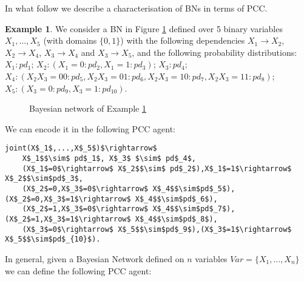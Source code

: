 \documentclass[letterpaper]{article}
\theoremstyle{plain}
\theoremstyle{definition}
\theoremstyle{remark}
\theoremstyle{definition}
\newtheorem{example}{Example}[section]
\begin{document}
In what follow we describe a characterisation of BNs in terms of PCC.
\begin{example}\label{exBN}
We consider a BN in Figure \ref{BN} 
defined over 5 binary variables $X_1, \ldots, X_5$ (with domains $\{0,1\}$) with the following dependencies $X_1 \rightarrow X_2$, $X_2 \rightarrow X_4$, $X_3 \rightarrow X_4$ and $X_3 \rightarrow X_5$, and the following probability distributions:
$X_1 : pd_1$; $X_2 : (X_1 = 0 : pd_2, X_1=1 : pd_3)$; $X_3 : pd_4$; $X_4 : (X_2 X_3 = 0 0  : pd_5, X_2 X_3 = 0 1  : pd_6, X_2 X_3 = 1 0  : pd_7, X_2  X_3 = 1 1  : pd_8)$; $X_5 : (X_3 = 0 : pd_9, X_3=1 : pd_{10})$.
\begin{figure}[h!]
\begin{center}
\scriptsize
{}
\caption{Bayesian network of Example \ref{exBN}}
\label{BN}
\end{center}
\end{figure}
We can encode it in the following PCC agent: 
\begin{lstlisting}[mathescape=true]
joint(X$_1$,...,X$_5$)$\rightarrow$
	X$_1$$\sim$ pd$_1$, X$_3$ $\sim$ pd$_4$, 
	(X$_1$=0$\rightarrow$ X$_2$$\sim$ pd$_2$),X$_1$=1$\rightarrow$ X$_2$$\sim$pd$_3$,
	(X$_2$=0,X$_3$=0$\rightarrow$ X$_4$$\sim$pd$_5$),(X$_2$=0,X$_3$=1$\rightarrow$ X$_4$$\sim$pd$_6$),
	(X$_2$=1,X$_3$=0$\rightarrow$ X$_4$$\sim$pd$_7$),(X$_2$=1,X$_3$=1$\rightarrow$ X$_4$$\sim$pd$_8$),
	(X$_3$=0$\rightarrow$ X$_5$$\sim$pd$_9$),(X$_3$=1$\rightarrow$ X$_5$$\sim$pd$_{10}$). 
 \end{lstlisting}
\end{example}

In general, given a Bayesian Network defined on $n$ variables $Var=\{X_1, \ldots, X_n\}$ we can define the following PCC agent:
\end{document}
